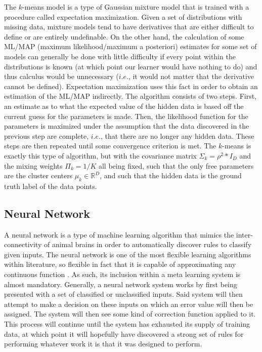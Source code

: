 The $k$-means model is a type of Gaussian mixture model that is trained with a
procedure called expectation maximization. Given a set of distributions with
missing data, mixture models tend to have derivatives that are either difficult
to define or are entirely undefinable. On the other hand, the calculation of some
ML/MAP (maximum likelihood/maximum a posteriori) estimates for some set of models
can generally be done with little difficulty if every point within the
distributions is known (at which point our learner would have nothing to do) and
thus calculus would be unnecessary ($i.e.$, it would not matter that the derivative
cannot be defined). Expectation maximization uses this fact in order to obtain an
estimation of the ML/MAP indirectly. The algorithm consists of two steps. First,
an estimate as to what the expected value of the hidden data is based off the
current guess for the parameters is made. Then, the likelihood function for the
parameters is maximized under the assumption that the data discovered in the
previous step are complete, $i.e.$, that there are no longer any hidden data. These
steps are then repeated until some convergence criterion is met. The $k$-means is
exactly this type of algorithm, but with the covariance matrix
$\Sigma_{k} = \rho^{2}*I_{D}$ and the mixing weights $\Pi_{k} = 1/K$ all being fixed,
such that the only free parameters are the cluster centers $\mu_{k} \in \mathbb{R}^{D}$,
and such that the hidden data is the ground truth label of the data points.
\subsection{Neural Network}
A neural network is a type of machine learning algorithm that mimics
the inter-connectivity of animal brains in order to automatically
discover rules to classify given inputs. The neural network is one of the most
flexible learning algorithms within literature, so flexible in fact that it is
capable of approximating any continuous function \cite{Hornik}. As such, its
inclusion within a meta learning system is almost mandatory.  Generally,
a neural network system works by first being presented with a set of classified or
unclassified inputs. Said system will then attempt to
make a decision on these inputs on which an error value will then be
assigned. The system will then see some kind of correction function
applied to it. This process will continue until the system has
exhausted its supply of training data, at which point it will
hopefully have discovered a strong set of rules for performing whatever
work it is that it was designed to perform.

